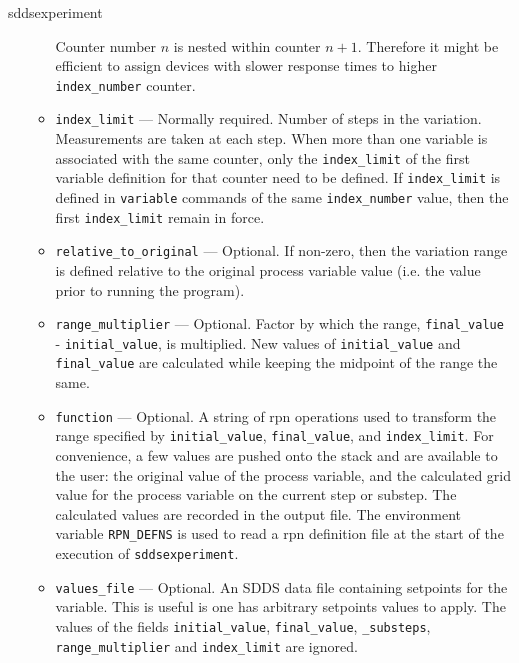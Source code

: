 \begin{sddsprog}{sddsexperiment}
\begin{itemize}
\begin{itemize}
                Counter number $n$ is nested within counter $n+1$. Therefore it might be efficient
                to assign devices with slower response times to
                higher \verb+index_number+ counter.
        \item {\verb+index_limit+} --- Normally required. 
                Number of steps in the variation. Measurements are taken at each step. 
                When more than one variable is associated with the same counter, only the {\verb+index_limit+}
                of the first variable definition for that counter need to be defined.
                If {\verb+index_limit+} is defined in {\verb+variable+} commands
                of the same  {\verb+index_number+} value, then the first {\verb+index_limit+}
                remain in force.
        \item {\verb+relative_to_original+} --- Optional. If non-zero, then the variation range is defined 
                relative to the original process variable value (i.e. the value prior to running the program).
        \item {\verb+range_multiplier+} --- Optional. Factor by which the range, {\verb+final_value+} - {\verb+initial_value+}, is multiplied.
                New values of {\verb+initial_value+} and {\verb+final_value+} are calculated while keeping the midpoint of
                the range the same.
        \item {\verb+function+} --- Optional. A string of rpn operations used to transform the range specified 
                by {\verb+initial_value+}, {\verb+final_value+}, and {\verb+index_limit+}. 
                For convenience, a few values are pushed onto the stack and are available
                to the user: the original value of the process variable, and the 
                calculated grid value for the process variable on the current step or substep. 
                The calculated values are
                recorded in the output file. The environment variable \verb+RPN_DEFNS+
                is used to read a rpn definition file at the start of the execution of \verb+sddsexperiment+.
        \item {\verb+values_file+} --- Optional. An SDDS data file containing setpoints for the variable.
                This is useful is one has arbitrary setpoints values to apply.
                The values of the fields {\verb+initial_value+}, {\verb+final_value+}, {\verb+_substeps+}, 
                {\verb+range_multiplier+} and {\verb+index_limit+} are ignored. 


\end{itemize}
\end{itemize}
\end{sddsprog}
